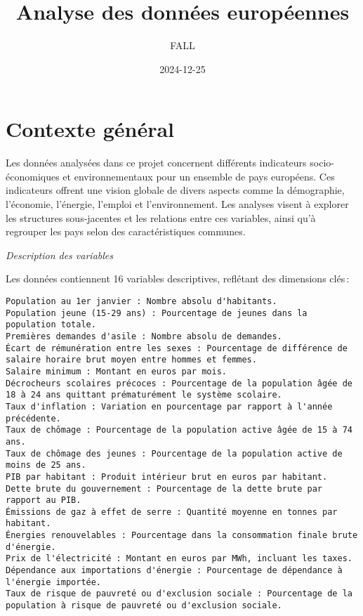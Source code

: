 \documentclass[
]{article}
\title{Analyse des données européennes}
\author{FALL}
\date{2024-12-25}
\begin{document}
\maketitle

{
\setcounter{tocdepth}{2}
\tableofcontents
}
\section{Contexte général}\label{contexte-guxe9nuxe9ral}

Les données analysées dans ce projet concernent différents indicateurs
socio-économiques et environnementaux pour un ensemble de pays
européens. Ces indicateurs offrent une vision globale de divers aspects
comme la démographie, l'économie, l'énergie, l'emploi et
l'environnement. Les analyses visent à explorer les structures
sous-jacentes et les relations entre ces variables, ainsi qu'à regrouper
les pays selon des caractéristiques communes.

\emph{Description des variables}

Les données contiennent 16 variables descriptives, reflétant des
dimensions clés\,:

\begin{verbatim}
Population au 1er janvier : Nombre absolu d'habitants.
Population jeune (15-29 ans) : Pourcentage de jeunes dans la population totale.
Premières demandes d'asile : Nombre absolu de demandes.
Écart de rémunération entre les sexes : Pourcentage de différence de salaire horaire brut moyen entre hommes et femmes.
Salaire minimum : Montant en euros par mois.
Décrocheurs scolaires précoces : Pourcentage de la population âgée de 18 à 24 ans quittant prématurément le système scolaire.
Taux d'inflation : Variation en pourcentage par rapport à l'année précédente.
Taux de chômage : Pourcentage de la population active âgée de 15 à 74 ans.
Taux de chômage des jeunes : Pourcentage de la population active de moins de 25 ans.
PIB par habitant : Produit intérieur brut en euros par habitant.
Dette brute du gouvernement : Pourcentage de la dette brute par rapport au PIB.
Émissions de gaz à effet de serre : Quantité moyenne en tonnes par habitant.
Énergies renouvelables : Pourcentage dans la consommation finale brute d'énergie.
Prix de l'électricité : Montant en euros par MWh, incluant les taxes.
Dépendance aux importations d'énergie : Pourcentage de dépendance à l'énergie importée.
Taux de risque de pauvreté ou d'exclusion sociale : Pourcentage de la population à risque de pauvreté ou d'exclusion sociale.
\end{verbatim}
\end{document}
